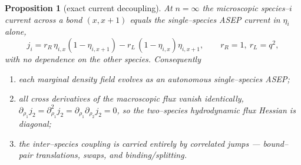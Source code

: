 \documentclass[11pt]{article}
\theoremstyle{plain}
\newtheorem{proposition}[theorem]{Proposition}
\theoremstyle{definition}
\theoremstyle{remark}
\begin{document}
\begin{proposition}[exact current decoupling]\label{prop:decouple}
At $n=\infty$ the microscopic species--$i$ current across a bond $(x,x{+}1)$ equals the
single--species ASEP current in $\eta_i$ alone,
\begin{equation}\label{eq:jdecouple}
  j_i=r_R\,\eta_{i,x}(1-\eta_{i,x+1})-r_L\,(1-\eta_{i,x})\eta_{i,x+1},
  \qquad r_R=1,\ r_L=q^2,
\end{equation}
with no dependence on the other species. Consequently
\begin{enumerate}
\item[\textup{(a)}] each marginal density field evolves as an \emph{autonomous}
single--species ASEP;
\item[\textup{(b)}] all cross derivatives of the macroscopic flux vanish identically,
$\partial_{\rho_1}j_2=\partial^2_{\rho_1}j_2=\partial_{\rho_1}\partial_{\rho_2}j_2=0$,
so the two--species hydrodynamic flux Hessian is diagonal;
\item[\textup{(c)}] the inter--species coupling is carried entirely by correlated
jumps --- bound--pair translations, swaps, and binding/splitting.
\end{enumerate}
\end{proposition}
\end{document}
